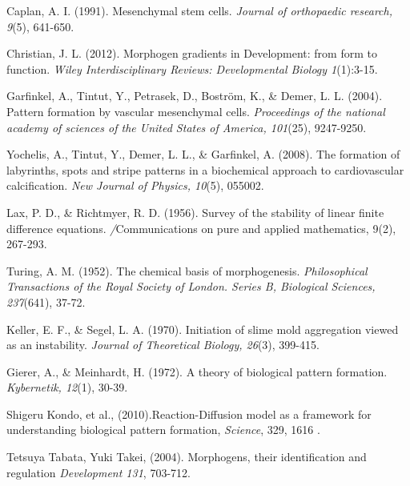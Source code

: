 \documentclass[12pt]{article}
\begin{document}
\begin{thebibliography}{}
 Caplan, A. I. (1991). Mesenchymal stem cells. \textit{Journal of orthopaedic research, 9}(5), 641-650.
 
 Christian, J. L. (2012). Morphogen gradients in Development: from form to function. \textit{Wiley Interdisciplinary Reviews: Developmental Biology 1}(1):3-15.
 
 Garfinkel, A., Tintut, Y., Petrasek, D., Boström, K., \& Demer, L. L. (2004). Pattern formation by vascular mesenchymal cells. \textit{Proceedings of the national academy of sciences of the United States of America, 101}(25), 9247-9250.
 
 Yochelis, A., Tintut, Y., Demer, L. L., \& Garfinkel, A. (2008). The formation of labyrinths, spots and stripe patterns in a biochemical approach to cardiovascular calcification. \textit{New Journal of Physics, 10}(5), 055002.
 
 Lax, P. D., \& Richtmyer, R. D. (1956). Survey of the stability of linear finite difference equations. \textit/{Communications on pure and applied mathematics, 9}(2), 267-293.
 
 Turing, A. M. (1952). The chemical basis of morphogenesis. \textit{Philosophical Transactions of the Royal Society of London. Series B, Biological Sciences, 237}(641), 37-72.
 
 Keller, E. F., \& Segel, L. A. (1970). Initiation of slime mold aggregation viewed as an instability. \textit{Journal of Theoretical Biology, 26}(3), 399-415.
 
 Gierer, A., \& Meinhardt, H. (1972). A theory of biological pattern formation. \textit{Kybernetik, 12}(1), 30-39.
 
 Shigeru Kondo, et al., (2010).Reaction-Diffusion model as a framework for understanding biological pattern formation,\textit{ Science}, 329, 1616 .
  
 Tetsuya Tabata, Yuki Takei, (2004). Morphogens, their identification and regulation
 \textit{ Development 131}, 703-712.  
 
\end{thebibliography}
\end{document}
